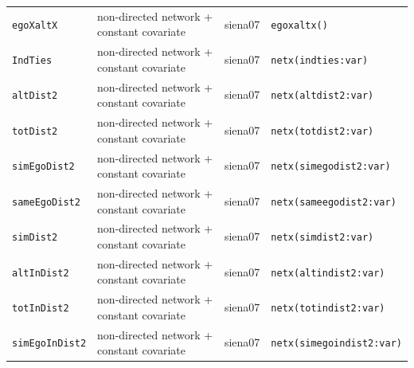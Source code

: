 \begin{longtable}{@{}p{2.6cm}p{3.2cm}p{2.9cm}p{5.4cm}@{}}
\texttt{egoXaltX} & non-directed network + constant covariate & siena07 & \texttt{egoxaltx()}\\
\texttt{IndTies} & non-directed network + constant covariate & siena07 & \texttt{netx(indties:var)}\\
\texttt{altDist2} & non-directed network + constant covariate & siena07 & \texttt{netx(altdist2:var)}\\
\texttt{totDist2} & non-directed network + constant covariate & siena07 & \texttt{netx(totdist2:var)}\\
\texttt{simEgoDist2} & non-directed network + constant covariate & siena07 & \texttt{netx(simegodist2:var)}\\
\texttt{sameEgoDist2} & non-directed network + constant covariate & siena07 & \texttt{netx(sameegodist2:var)}\\
\texttt{simDist2} & non-directed network + constant covariate & siena07 & \texttt{netx(simdist2:var)}\\
\texttt{altInDist2} & non-directed network + constant covariate & siena07 & \texttt{netx(altindist2:var)}\\
\texttt{totInDist2} & non-directed network + constant covariate & siena07 & \texttt{netx(totindist2:var)}\\
\texttt{simEgoInDist2} & non-directed network + constant covariate & siena07 & \texttt{netx(simegoindist2:var)}\\
\bottomrule
\end{longtable}
\normalsize

